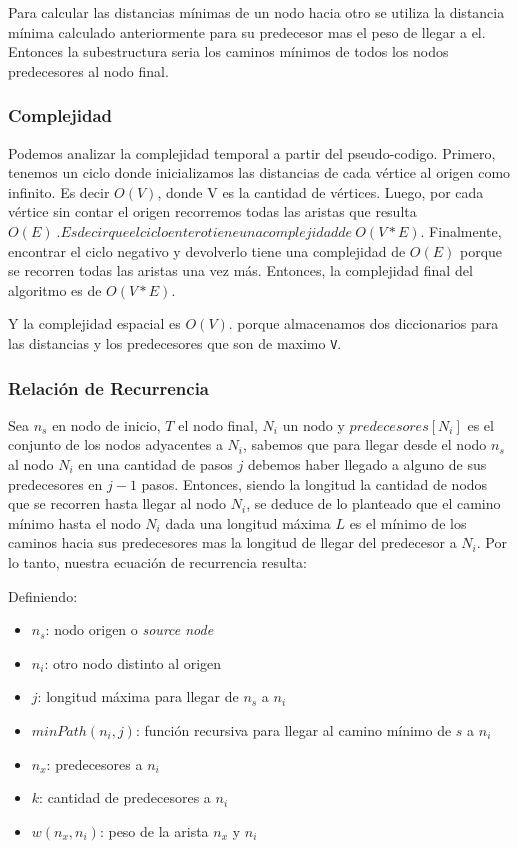 \documentclass[titlepage,a4paper]{article}
\begin{document}
Para calcular las distancias mínimas de un nodo hacia otro se utiliza la
distancia mínima calculado anteriormente para su predecesor mas el peso de
llegar a el. Entonces la subestructura seria los caminos mínimos de todos los
nodos predecesores al nodo final.

\subsubsection{Complejidad}
\label{sec:org77e5efb}

Podemos analizar la complejidad temporal a partir del pseudo-codigo. Primero,
tenemos un ciclo donde inicializamos las distancias de cada vértice al origen
como infinito. Es decir \(O(V)\), donde V es la cantidad de vértices. Luego, por
cada vértice sin contar el origen recorremos todas las aristas que resulta
\(O(E)~. Es decir que el ciclo entero tiene una complejidad de ~O(V * E)\).
Finalmente, encontrar el ciclo negativo y devolverlo tiene una complejidad de
\(O(E)\) porque se recorren todas las aristas una vez más.  Entonces, la
complejidad final del algoritmo es de \(O(V * E)\).

Y la complejidad espacial es \(O(V)\). porque almacenamos dos diccionarios para
las distancias y los predecesores que son de maximo \texttt{V}.

\subsubsection{Relación de Recurrencia}
\label{sec:orgcf77066}

Sea \(n_s\) en nodo de inicio, \(T\) el nodo final, \(N_i\) un nodo y \(predecesores[N_i]\) es el
conjunto de los nodos adyacentes a \(N_i\), sabemos que para llegar desde el nodo \(n_s\)
al nodo \(N_i\) en una cantidad de pasos \(j\) debemos haber llegado a alguno de sus
predecesores en \(j-1\) pasos. Entonces, siendo la longitud la cantidad de nodos que
se recorren hasta llegar al nodo \(N_i\), se deduce de lo planteado que el camino
mínimo hasta el nodo \(N_i\) dada una longitud máxima \(L\) es el mínimo de los caminos
hacia sus predecesores mas la longitud de llegar del predecesor a \(N_i\). Por lo
tanto, nuestra ecuación de recurrencia resulta:

Definiendo:
\begin{itemize}
\item \(n_s\): nodo origen o \emph{source node}
\item \(n_i\): otro nodo distinto al origen
\item \(j\): longitud máxima para llegar de \(n_s\) a \(n_i\)
\item \(minPath(n_i, j)\): función recursiva para llegar al camino mínimo de \(s\) a \(n_i\)
\item \(n_x\): predecesores a \(n_i\)
\item \(k\): cantidad de predecesores a \(n_i\)
\item \(w(n_x,n_i)\): peso de la arista \(n_x\) y \(n_i\)
\end{itemize}
\end{document}
